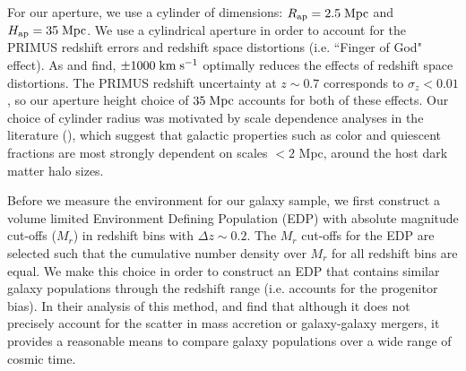 \documentclass{emulateapj}
\def \apradius{2.5}
\def \apheight{35}
\begin{document}
For our aperture, we use a cylinder of dimensions: $R_{\rm{ap}} =
\apradius\;
\rm{Mpc}$ and $H_{\rm{ap}} = \apheight\; \rm{Mpc}$.  We use a
cylindrical aperture in order to account for the PRIMUS redshift
errors and redshift space distortions (i.e. ``Finger of God"
effect). As \cite{Cooper:2005aa} and \cite{Gallazzi:2009aa} find, 
$\pm 1000 \; \rm{km} \;\rm{s^{-1}}$ optimally reduces the effects of redshift space
distortions. The PRIMUS redshift uncertainty at $z \sim 0.7$
corresponds to $\sigma_z < 0.01$, so our aperture height choice of
$\apheight\;
\rm{Mpc}$ accounts for both of these effects. Our choice of
cylinder radius was motivated by scale dependence analyses in the
literature (\citealt{Blanton:2006aa, Wilman:2010aa, Muldrew:2012aa}),
which suggest that galactic properties such as color and quiescent
fractions are most strongly dependent on scales $< 2$ Mpc, around the
host dark matter halo sizes.



Before we measure the environment for our galaxy sample, we first
construct a volume limited Environment Defining Population (EDP) with
absolute magnitude cut-offs ($M_{r}$) in redshift bins with $\Delta z
\sim 0.2$. The $M_{r}$ cut-offs for the EDP are selected such that the
cumulative number density over $M_{r}$ for all redshift bins are
equal.  We make this choice in order to construct an EDP that contains
similar galaxy populations through the redshift range (i.e. accounts
for the progenitor bias). In their analysis of this method,
\cite{Behroozi:2013aa} and \cite{Leja:2013aa} find that although it
does not precisely account for the scatter in mass accretion or
galaxy-galaxy mergers, it provides a reasonable means to compare
galaxy populations over a wide range of cosmic time.
\end{document}
